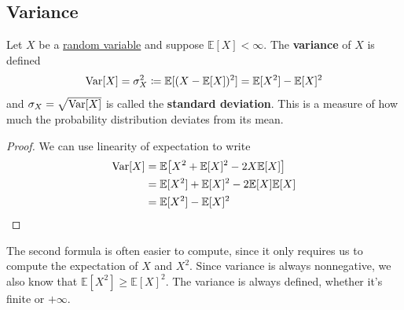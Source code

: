 \subsection{Variance}

  \begin{definition}[Variance]
    \label{def:variance}
    Let $X$ be a \hyperref[def:random-variable]{random variable} and suppose $\mathbb{E}[X] < \infty$. The \textbf{variance} of $X$ is defined 
    \begin{equation}
			\operatorname{Var}[X] = \sigma^2_X \coloneqq \mathbb{E} [ (X - \mathbb{E}[X])^2 ]= \mathbb{E}[X^2] - \mathbb{E}[X]^2
    \end{equation}
    and $\sigma_X = \sqrt{\operatorname{Var}[X]}$ is called the \textbf{standard deviation}. This is a measure of how much the probability distribution deviates from its mean. 
  \end{definition}
	\begin{proof}
		We can use linearity of expectation to write 
    \begin{align*}
      \operatorname{Var}[X] & = \mathbb{E} \big[ X^2 + \mathbb{E}[X]^2 - 2 X \mathbb{E}[X] \big] \\
      & = \mathbb{E}[X^2] + \mathbb{E}[X]^2 - 2 \mathbb{E}[X] \mathbb{E}[X] \\
      & = \mathbb{E}[X^2] - \mathbb{E}[X]^2
    \end{align*}
	\end{proof}

	The second formula is often easier to compute, since it only requires us to compute the expectation of $X$ and $X^2$. Since variance is always nonnegative, we also know that $\mathbb{E}[X^2] \geq \mathbb{E}[X]^2$. The variance is always defined, whether it's finite or $+\infty$. 

